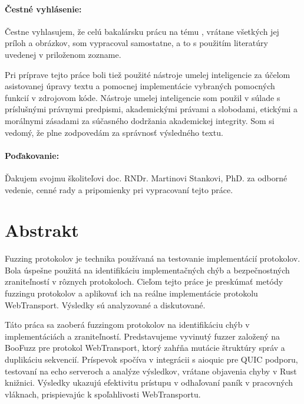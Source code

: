 \documentclass[12pt, twoside, openany]{book}
\def\mfnazov{Fuzzing protokolu WebTransport}
\begin{document}


\newpage 
\pagestyle{plain}
\paragraph{Čestné vyhlásenie:}
Čestne vyhlasujem, že celú bakalársku prácu na tému \uv{\mfnazov},
vrátane všetkých jej príloh a obrázkov, som vypracoval
samostatne, a to s použitím literatúry uvedenej v priloženom zozname.

Pri príprave tejto práce boli tiež použité nástroje umelej
inteligencie za účelom asistovanej úpravy textu a pomocnej
implementácie vybraných pomocných funkcií v zdrojovom kóde. Nástroje umelej
inteligencie som použil v súlade s príslušnými právnymi
predpismi, akademickými právami a slobodami, etickými a morálnymi
zásadami za súčasného dodržania akademickej integrity. Som si
vedomý, že plne zodpovedám za správnosť výsledného textu.

\paragraph{Poďakovanie:} Ďakujem svojmu školiteľovi doc. RNDr. Martinovi Stankovi, PhD. za odborné vedenie, cenné rady a pripomienky pri vypracovaní tejto práce.


\newpage 
\section*{Abstrakt}

Fuzzing protokolov je technika používaná na testovanie implementácií protokolov. Bola úspešne použitá na identifikáciu implementačných chýb a bezpečnostných zraniteľností v rôznych protokoloch. Cieľom tejto práce je preskúmať metódy fuzzingu protokolov a aplikovať ich na reálne implementácie protokolu WebTransport. Výsledky sú analyzované a diskutované.

Táto práca sa zaoberá fuzzingom protokolov na identifikáciu chýb v implementáciách a zraniteľností. Predstavujeme vyvinutý fuzzer založený na BooFuzz pre protokol WebTransport, ktorý zahŕňa mutácie štruktúry správ a duplikáciu sekvencií. Príspevok spočíva v integrácii s aioquic pre QUIC podporu, testovaní na echo serveroch a analýze výsledkov, vrátane objavenia chyby v Rust knižnici. Výsledky ukazujú efektivitu prístupu v odhaľovaní paník v pracovných vláknach, prispievajúc k spoľahlivosti WebTransportu.
\end{document}
